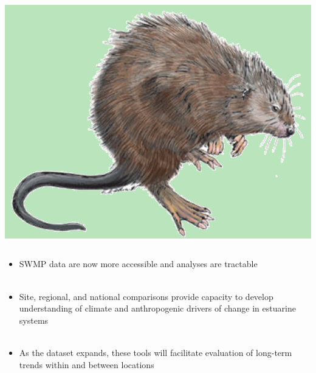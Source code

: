\documentclass[serif]{beamer}\usepackage[]{graphicx}\usepackage[]{color}
\begin{document}
\begin{frame}[t, fragile]{\includegraphics[width=0.05\paperwidth]{fig/muskrat.png}\hspace{0.07in}{\bf Continuing work and engagement}}
\begin{columns}
\begin{column}{0.53\textwidth}
\centerline{}
\end{column}
\begin{column}{0.43 \textwidth}
\centerline{}
\end{column}
\end{columns}
\vspace{0.2in}
\begin{itemize}
\item SWMP data are now more accessible and analyses are tractable\\~\\
\item Site, regional, and national comparisons provide capacity to develop understanding of climate and anthropogenic drivers of change in estuarine systems \\~\\
\item As the dataset expands, these tools will facilitate evaluation of long-term trends within and between locations
\end{itemize}
\end{frame}
\end{document}
